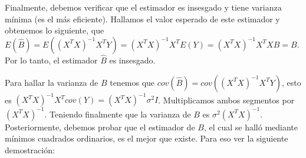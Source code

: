\documentclass{article}
\begin{document}
Finalmente, debemos verificar que el estimador es insesgado y tiene varianza mínima (es el más eficiente). Hallamos el valor esperado de este estimador y obtenemos lo siguiente, que $E(\hat{B})=E((X^{T}X)^{-1}X^{T}Y)=(X^{T}X)^{-1}X^{T}E(Y)=(X^{T}X)^{-1}X^{T}XB=B$. Por lo tanto, el estimador $\hat{B}$ es insesgado.

Para hallar la varianza de $B$ tenemos que $cov(\hat{B})=cov((X^{T}X)^{-1}X^{T}Y)$, esto es $(X^{T}X)^{-1}X^{T}cov(Y)=(X^{T}X)^{-1}\sigma^{2}I$. Multiplicamos ambos segmentos por $(X^{T}X)^{-1}$. Teniendo finalmente que la varianza de $B$ es $\sigma^{2}(X^{T}X)^{-1}$. 
Posteriormente, debemos probar que el estimador de $B$, el cual se halló mediante mínimos cuadrados ordinarios, es el mejor que existe. Para eso ver la siguiente demostración:
\end{document}
